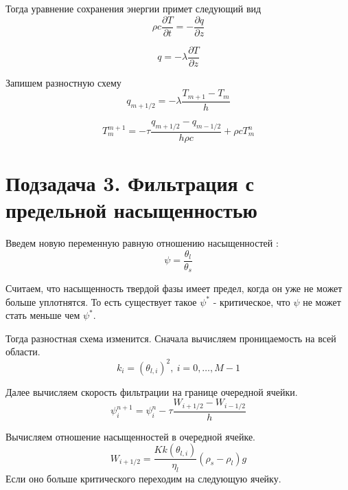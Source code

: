 \documentclass[12pt]{article}
\newcommand{\pd}[2]{\frac{\partial #1}{\partial #2}}
\begin{document}
Тогда уравнение сохранения энергии примет следующий вид
\begin{equation}
\rho c \pd{T}{t} = - \pd{q}{z}
\label{termal_1}
\end{equation}

\begin{equation}
q = - \lambda\pd{T}{z}
\label{termal_2}
\end{equation}

Запишем разностную схему
\begin{equation}
q_{m+1/2} = - \lambda\frac{T_{m+1} - T_m}{h}
\label{termal_razn_1}
\end{equation}

\begin{equation}
T_m^{m+1} = - \tau\frac{q_{m+1/2} - q_{m-1/2}}{h\rho c} + \rho c T_m^n
\label{termal_razn_2}
\end{equation}

\newpage
\section*{Подзадача 3. Фильтрация с предельной насыщенностью}
Введем новую переменную равную отношению насыщенностей : 
$$
\psi = \frac{\theta_l}{\theta_s} 
$$

Считаем, что насыщенность твердой фазы имеет предел, когда он уже не может больше уплотнятся. То есть существует такое $ \psi^* $ - критическое, что $\psi $ не может стать меньше чем $\psi^*$. 

Тогда разностная схема изменится. 
Сначала вычисляем проницаемость на всей области.
\begin{equation}
k_i = (\theta_{l,i})^2 , \ i = 0,  \dots ,M-1
\label{perm_razn2}
\end{equation}

Далее вычисляем скорость фильтрации на границе очередной ячейки.
\begin{equation}
\psi_i^{n+1} = \psi_i^n - \tau\frac{W_{i+1/2} - W_{i-1/2}}{h}
\label{filtr_razn2}
\end{equation}

Вычисляем отношение насыщенностей в очередной ячейке. 
\begin{equation}
W_{i+1/2} = \frac{K k(\theta_{l,i})}{\eta_l}(\rho_s-\rho_l)g
\label{Darsi_razn2}
\end{equation}
Если оно больше критического переходим на следующую ячейку.
\end{document}
